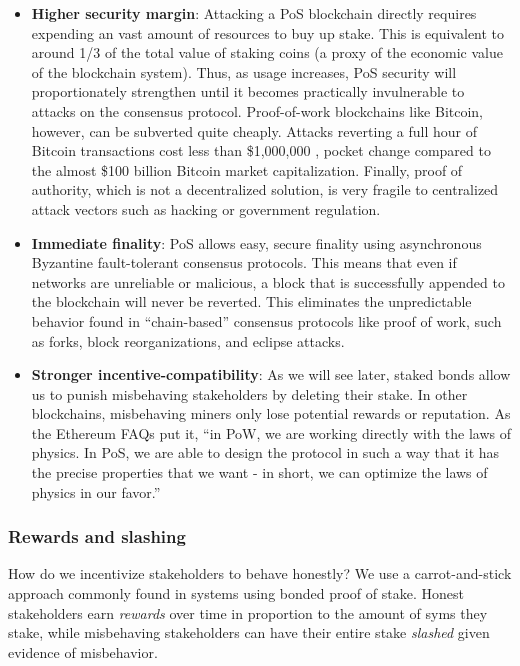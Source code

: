 \documentclass[headinclude,12pt]{scrbook}
\begin{document}
\begin{itemize}
    \item
          \textbf{Higher security margin}: Attacking a PoS blockchain directly
          requires expending an vast amount of resources to buy up stake. This
          is equivalent to around 1/3 of the total value of staking coins (a
          proxy of the economic value of the blockchain system). Thus, as usage
          increases, PoS security will proportionately strengthen until it
          becomes practically invulnerable to attacks on the consensus protocol.
          Proof-of-work blockchains like Bitcoin, however, can be subverted
          quite cheaply. Attacks reverting a full hour of Bitcoin transactions
          cost less than \$1,000,000 \cite{crypto51}, pocket change compared to
          the almost \$100 billion Bitcoin market capitalization. Finally, proof
          of authority, which is not a decentralized solution, is very fragile
          to centralized attack vectors such as hacking or government
          regulation.
    \item
          \textbf{Immediate finality}: PoS allows easy, secure finality using
          asynchronous Byzantine fault-tolerant consensus protocols. This means
          that even if networks are unreliable or malicious, a block that is
          successfully appended to the blockchain will never be reverted. This
          eliminates the unpredictable behavior found in ``chain-based''
          consensus protocols like proof of work, such as forks, block
          reorganizations, and eclipse attacks.
    \item
          \textbf{Stronger incentive-compatibility}: As we will see later,
          staked bonds allow us to punish misbehaving stakeholders by deleting
          their stake. In other blockchains, misbehaving miners only lose
          potential rewards or reputation. As the Ethereum FAQs put it, ``in
          PoW, we are working directly with the laws of physics. In PoS, we are
          able to design the protocol in such a way that it has the precise
          properties that we want - in short, we can optimize the laws of
          physics in our favor.''
\end{itemize}

\subsubsection{Rewards and slashing}

How do we incentivize stakeholders to behave honestly? We use a
carrot-and-stick approach commonly found in systems using bonded proof
of stake. Honest stakeholders earn \emph{rewards} over time in
proportion to the amount of syms they stake, while misbehaving
stakeholders can have their entire stake \emph{slashed} given evidence
of misbehavior.
\end{document}
